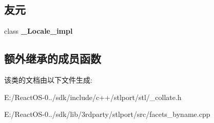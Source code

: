 \subsection*{友元}
\begin{DoxyCompactItemize}
\item 
\mbox{\label{classcollate__byname_3_01wchar__t_01_4_ae9c09ac7cd16ad35f8fdb1587ac77eb8}} 
class {\bfseries \+\_\+\+Locale\+\_\+impl}
\end{DoxyCompactItemize}
\subsection*{额外继承的成员函数}


该类的文档由以下文件生成\+:\begin{DoxyCompactItemize}
\item 
E\+:/\+React\+O\+S-\/0../sdk/include/c++/stlport/stl/\+\_\+collate.\+h\item 
E\+:/\+React\+O\+S-\/0../sdk/lib/3rdparty/stlport/src/facets\+\_\+byname.\+cpp\end{DoxyCompactItemize}
